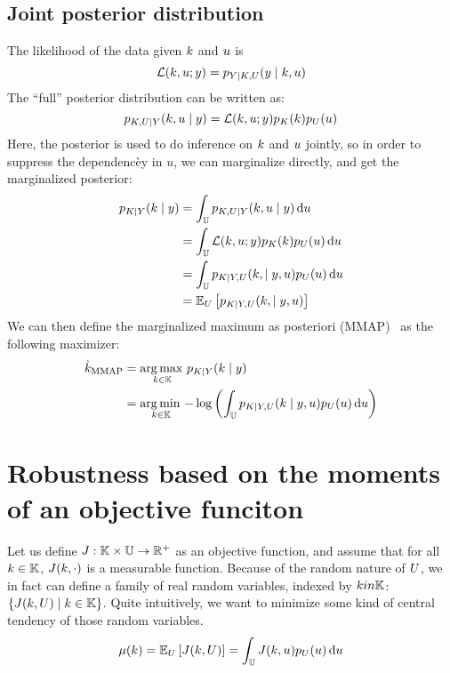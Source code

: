 \documentclass[../../Main_ManuscritThese.tex]{subfiles}
\begin{document}
\subsection{Joint posterior distribution}
The likelihood of the data given $k$ and $u$ is
\begin{equation}
  \mathcal{L}(k,u;y) = p_{Y \mid K, U}(y\mid k,u)
\end{equation}
The ``full'' posterior distribution can be written as:
\begin{equation}
  p_{K,U \mid Y}(k,u \mid y) = \mathcal{L}(k,u;y)p_{K}(k)p_{U}(u)
\end{equation}
Here, the posterior is used to do inference on $k$ and $u$ jointly, so in order to suppress the dependencèy in $u$, we can marginalize directly, and get the marginalized posterior:
\begin{align}
  p_{K \mid Y}(k \mid y) &= \int_{\mathbb{U}} p_{K,U\mid Y}(k,u\mid y)\,\mathrm{d}u\\
                             &=\int_{\mathbb{U}} \mathcal{L}(k,u;y)p_{K}(k)p_{U}(u)\,\mathrm{d}u \\
                             &=\int_{\mathbb{U}}p_{K\mid Y,U}(k,\mid y,u)p_{U}(u)\,\mathrm{d}u \\
                             &= \mathbb{E}_{U}\left[p_{K\mid Y,U}(k,\mid y,u)\right]
\end{align}
We can then define the marginalized maximum as posteriori (MMAP)~\cite{doucet_marginal_2002} as the following maximizer:
\begin{align}
  \label{eq:def_MMAP}
  \hat{k}_{\mathrm{MMAP}} &= \operatorname*{arg\,max \,}_{k\in\mathbb{K}} p_{K \mid Y}(k\mid y) \\
                        &= \operatorname*{arg\,min \,}_{k\in\mathbb{K}} -\log \left(\int_{\mathbb{U}} p_{K\mid Y,U}(k\mid y, u) p_{U}(u)\,\mathrm{d}u \right)
\end{align}

\section{Robustness based on the moments of an objective funciton}
\label{sec:rob_moments}
Let us define $J:\mathbb{K} \times \mathbb{U}\rightarrow \mathbb{R}^+$ as an objective function, and assume that for all $k \in \mathbb{K}$, $J(k, \cdot)$ is a measurable function. 
Because of the random nature of $U$, we in fact can define a family of real random variables, indexed by $k in \mathbb{K}$: $\{J(k,U) \mid k \in \mathbb{K}\}$. Quite intuitively, we want to minimize some kind of central tendency of those random variables.
\begin{equation}
  \mu(k) = \mathbb{E}_U\left[J(k,U)\right] =\int_{\mathbb{U}} J(k,u)p_U(u)\,\mathrm{d}u
\end{equation}
\end{document}
